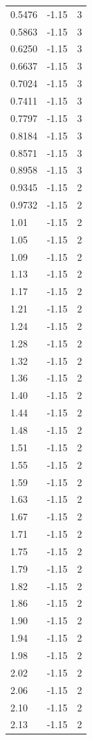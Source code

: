 \begin{longtable}{lrr}
  0.5476 & -1.15 & 3 \\
  0.5863 & -1.15 & 3 \\
  0.6250 & -1.15 & 3 \\
  0.6637 & -1.15 & 3 \\
  0.7024 & -1.15 & 3 \\
  0.7411 & -1.15 & 3 \\
  0.7797 & -1.15 & 3 \\
  0.8184 & -1.15 & 3 \\
  0.8571 & -1.15 & 3 \\
  0.8958 & -1.15 & 3 \\
  0.9345 & -1.15 & 2 \\
  0.9732 & -1.15 & 2 \\
  1.01 & -1.15 & 2 \\
  1.05 & -1.15 & 2 \\
  1.09 & -1.15 & 2 \\
  1.13 & -1.15 & 2 \\
  1.17 & -1.15 & 2 \\
  1.21 & -1.15 & 2 \\
  1.24 & -1.15 & 2 \\
  1.28 & -1.15 & 2 \\
  1.32 & -1.15 & 2 \\
  1.36 & -1.15 & 2 \\
  1.40 & -1.15 & 2 \\
  1.44 & -1.15 & 2 \\
  1.48 & -1.15 & 2 \\
  1.51 & -1.15 & 2 \\
  1.55 & -1.15 & 2 \\
  1.59 & -1.15 & 2 \\
  1.63 & -1.15 & 2 \\
  1.67 & -1.15 & 2 \\
  1.71 & -1.15 & 2 \\
  1.75 & -1.15 & 2 \\
  1.79 & -1.15 & 2 \\
  1.82 & -1.15 & 2 \\
  1.86 & -1.15 & 2 \\
  1.90 & -1.15 & 2 \\
  1.94 & -1.15 & 2 \\
  1.98 & -1.15 & 2 \\
  2.02 & -1.15 & 2 \\
  2.06 & -1.15 & 2 \\
  2.10 & -1.15 & 2 \\
  2.13 & -1.15 & 2 \\

\end{longtable}
